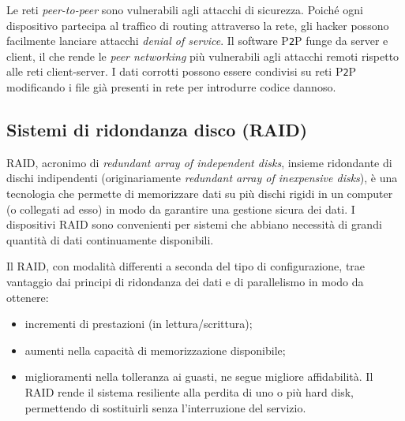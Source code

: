 Le reti \textit{peer-to-peer} sono vulnerabili agli attacchi di sicurezza. Poich\'{e} ogni dispositivo partecipa al traffico di routing attraverso la rete, gli hacker possono facilmente lanciare attacchi \textit{denial of service}.
Il software P\verb"2"P funge da server e client, il che rende le \textit{peer networking} pi\`{u} vulnerabili agli attacchi remoti rispetto alle reti client-server.
I dati corrotti possono essere condivisi su reti P\verb"2"P modificando i file gi\`{a} presenti in rete per introdurre codice dannoso.\cite{etichetta14}

\item
\subsection{Sistemi di ridondanza disco (RAID)}
RAID, acronimo di \textit{redundant array of independent disks}, insieme ridondante di dischi indipendenti (originariamente \textit{redundant array of inexpensive disks}), \`{e} una tecnologia che permette di memorizzare dati su pi\`{u} dischi rigidi in un computer (o collegati ad esso) in modo da garantire una gestione sicura dei dati\cite{etichetta9}. I dispositivi RAID sono convenienti per sistemi che abbiano necessit\`{a} di grandi quantit\`{a} di dati continuamente disponibili. 


Il RAID, con modalit\`{a} differenti a seconda del tipo di configurazione, trae vantaggio dai principi di ridondanza dei dati e di parallelismo in modo da ottenere:
\begin{itemize}
\item 
incrementi di prestazioni (in lettura/scrittura);
\item
aumenti nella capacit\`{a} di memorizzazione disponibile;
\item 
miglioramenti nella tolleranza ai guasti, ne segue migliore affidabilit\`{a}\cite{etichetta10}. Il RAID rende il sistema resiliente alla perdita di uno o pi\`{u} hard disk, permettendo di sostituirli senza l'interruzione del servizio.
\end{itemize}

